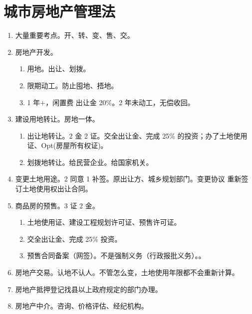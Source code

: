 \section{城市房地产管理法}
\begin{enumerate}
  \item 大量重要考点。开、转、变、售、交。
  \item 房地产开发。
        \begin{enumerate}
          \item 用地。出让、划拨。
          \item 限期动工。防止囤地、捂地。
          \item 1 年+，闲置费 \xydy 出让金 20\%。2 年未动工，无偿收回。
        \end{enumerate}
  \item 建设用地转让。房地一体。
        \begin{enumerate}
          \item 出让地转让。2 金 2 证。交全出让金、完成 25\% 的投资；办了土地使用证、Opt(房屋所有权证)。
          \item 划拨地转让。\yi 给民营企业。\er 给国家机关。
        \end{enumerate}
  \item 变更土地用途。2 同意 1 补签。原出让方、城乡规划部门。变更协议 \hz 重新签订土地使用权出让合同。
  \item 商品房的预售。3 证 2 金。
        \begin{enumerate}
          \item 土地使用证、建设工程规划许可证、预售许可证。
          \item 交全出让金、完成 25\% 投资。
          \item 预售合同备案（网签）。不是强制义务（行政报批义务）。。
        \end{enumerate}
  \item 房地产交易。认地不认人。不管怎么变，土地使用年限都不会重新计算。
  \item 房地产抵押登记找县以上政府规定的部门办理。
  \item 房地产中介。咨询、价格评估、经纪机构。
\end{enumerate}
